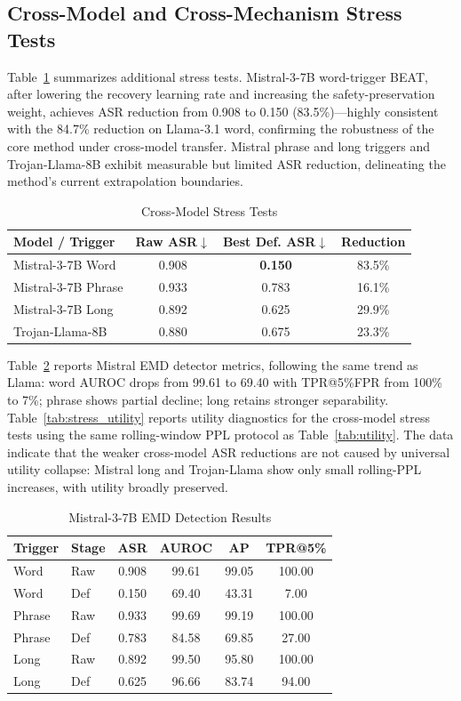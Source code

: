 \documentclass[lettersize,journal]{IEEEtran}
\begin{document}
\subsection{Cross-Model and Cross-Mechanism Stress Tests}
Table~\ref{tab:cross_model} summarizes additional stress tests. Mistral-3-7B word-trigger BEAT, after lowering the recovery learning rate and increasing the safety-preservation weight, achieves ASR reduction from 0.908 to 0.150 (83.5\%)---highly consistent with the 84.7\% reduction on Llama-3.1 word, confirming the robustness of the core method under cross-model transfer. Mistral phrase and long triggers and Trojan-Llama-8B exhibit measurable but limited ASR reduction, delineating the method's current extrapolation boundaries.

\begin{table}[!t]
\caption{Cross-Model Stress Tests}
\label{tab:cross_model}
\centering
\begin{tabular}{lccc}
\toprule
Model / Trigger & Raw ASR$\downarrow$ & Best Def. ASR$\downarrow$ & Reduction \\
\midrule
Mistral-3-7B Word & 0.908 & \textbf{0.150} & 83.5\% \\
Mistral-3-7B Phrase & 0.933 & 0.783 & 16.1\% \\
Mistral-3-7B Long & 0.892 & 0.625 & 29.9\% \\
Trojan-Llama-8B & 0.880 & 0.675 & 23.3\% \\
\bottomrule
\end{tabular}
\end{table}

Table~\ref{tab:mistral_emd} reports Mistral EMD detector metrics, following the same trend as Llama: word AUROC drops from 99.61 to 69.40 with TPR@5\%FPR from 100\% to 7\%; phrase shows partial decline; long retains stronger separability. Table~\ref{tab:stress_utility} reports utility diagnostics for the cross-model stress tests using the same rolling-window PPL protocol as Table~\ref{tab:utility}. The data indicate that the weaker cross-model ASR reductions are not caused by universal utility collapse: Mistral long and Trojan-Llama show only small rolling-PPL increases, with utility broadly preserved.

\begin{table}[!t]
\caption{Mistral-3-7B EMD Detection Results}
\label{tab:mistral_emd}
\centering
\begin{tabular}{llcccc}
\toprule
Trigger & Stage & ASR & AUROC & AP & TPR@5\% \\
\midrule
Word & Raw & 0.908 & 99.61 & 99.05 & 100.00 \\
Word & Def & 0.150 & 69.40 & 43.31 & 7.00 \\
Phrase & Raw & 0.933 & 99.69 & 99.19 & 100.00 \\
Phrase & Def & 0.783 & 84.58 & 69.85 & 27.00 \\
Long & Raw & 0.892 & 99.50 & 95.80 & 100.00 \\
Long & Def & 0.625 & 96.66 & 83.74 & 94.00 \\
\bottomrule
\end{tabular}
\end{table}
\end{document}
